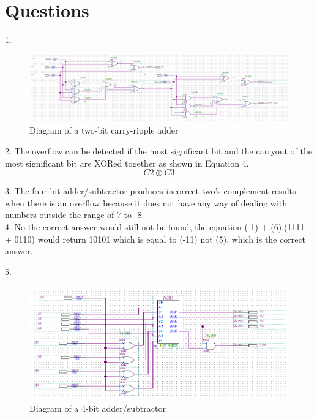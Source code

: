\documentclass[CMPE]{KGCOEReport}
\begin{document}
\section*{Questions}
1.
\begin{figure}[H]
	\centering
	\includegraphics[width=1.0\textwidth]{QuartusL6Q1}
	\caption{Diagram of a two-bit carry-ripple adder}
	\label{fig: Figure 6}
\end{figure}\break

2.
The overflow can be detected if the most significant bit and the carryout of the most significant bit are XORed together as shown in Equation 4.
\begin{equation} C2 \oplus C3 \end{equation}\break

3. The four bit adder/subtractor produces incorrect two's complement results when there is an overflow because it does not have any way of dealing with numbers outside the range of 7 to -8.\\

4. No the correct answer would still not be found, the equation (-1) + (6),(1111 + 0110) would return 10101 which is equal to (-11) not (5), which is the correct answer.\break

5.
\begin{figure}[H]
	\centering
	\includegraphics[width=1.0\textwidth]{QuartusL6Q2}
	\caption{Diagram of a 4-bit adder/subtractor}
	\label{fig: Figure 7}
\end{figure}\break
\end{document}
